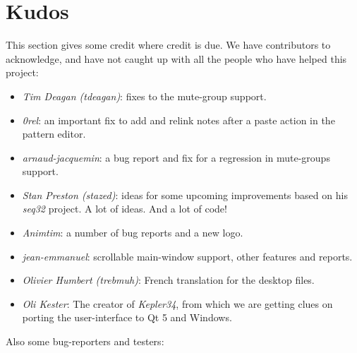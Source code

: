 %
%
%

\section{Kudos}
\label{sec:kudos}

   This section gives some credit where credit is due.
   We have contributors to acknowledge, and have not caught up with all the
   people who have helped this project:

   \begin{itemize}
      \item \textsl{Tim Deagan (tdeagan)}:
         fixes to the mute-group support.
      \item \textsl{0rel}:
         an important fix to add and relink notes after a
         paste action in the pattern editor.
      \item \textsl{arnaud-jacquemin}:
         a bug report and fix for a regression in mute-groups support.
      \item \textsl{Stan Preston (stazed)}:
         ideas for some upcoming improvements based
         on his \textsl{seq32} project.  A lot of ideas.
         And a lot of code!
      \item \textsl{Animtim}:
         a number of bug reports and a new logo.
      \item \textsl{jean-emmanuel}:
         scrollable main-window support, other features and reports.
      \item \textsl{Olivier Humbert (trebmuh)}:
         French translation for the desktop files.
      \item \textsl{Oli Kester}:
         The creator of \textsl{Kepler34}, from which we are getting
         clues on porting the user-interface to Qt 5 and Windows.
   \end{itemize}

   Also some bug-reporters and testers:

